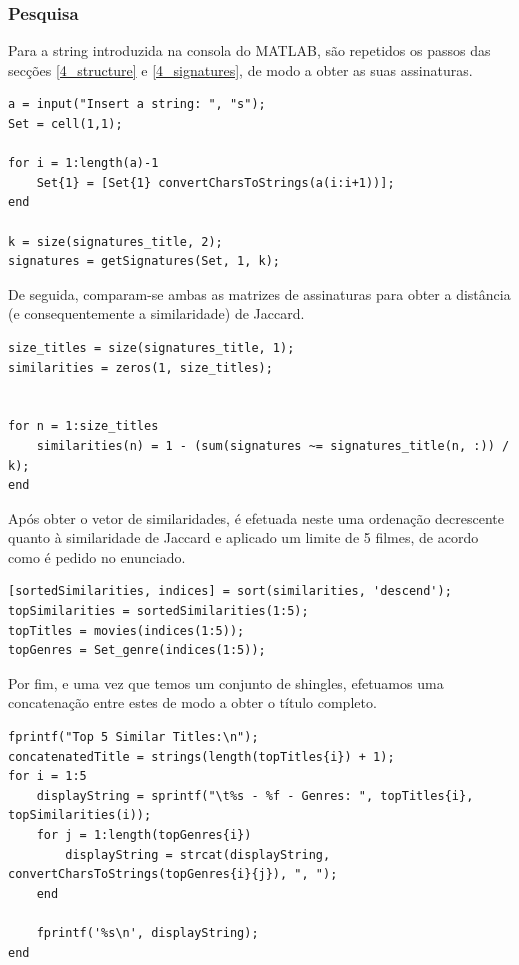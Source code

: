 \documentclass[portuguese, 11pt, a4paper,titlepage, oneside]{article}
\begin{document}
\subsubsection{Pesquisa}
Para a string introduzida na consola do MATLAB, são repetidos os passos das secções \ref{4_structure} e \ref{4_signatures}, de modo a obter as suas assinaturas.

\begin{lstlisting}[style=Matlab-editor]
a = input("Insert a string: ", "s");
Set = cell(1,1);

for i = 1:length(a)-1
    Set{1} = [Set{1} convertCharsToStrings(a(i:i+1))];
end

k = size(signatures_title, 2);
signatures = getSignatures(Set, 1, k);
\end{lstlisting}

De seguida, comparam-se ambas as matrizes de assinaturas para obter a distância (e consequentemente a similaridade) de Jaccard.

\begin{lstlisting}[style=Matlab-editor]
size_titles = size(signatures_title, 1);
similarities = zeros(1, size_titles);


for n = 1:size_titles
    similarities(n) = 1 - (sum(signatures ~= signatures_title(n, :)) / k);
end
\end{lstlisting}

Após obter o vetor de similaridades, é efetuada neste uma ordenação decrescente quanto à similaridade de Jaccard e aplicado um limite de 5 filmes, de acordo como é pedido no enunciado.
\begin{lstlisting}[style=Matlab-editor]
[sortedSimilarities, indices] = sort(similarities, 'descend');
topSimilarities = sortedSimilarities(1:5);
topTitles = movies(indices(1:5));
topGenres = Set_genre(indices(1:5));
\end{lstlisting}

Por fim, e uma vez que temos um conjunto de shingles, efetuamos uma concatenação entre estes de modo a obter o título completo.

\begin{lstlisting}[style=Matlab-editor]
fprintf("Top 5 Similar Titles:\n");
concatenatedTitle = strings(length(topTitles{i}) + 1);
for i = 1:5
    displayString = sprintf("\t%s - %f - Genres: ", topTitles{i}, topSimilarities(i));
    for j = 1:length(topGenres{i})
        displayString = strcat(displayString, convertCharsToStrings(topGenres{i}{j}), ", ");
    end

    fprintf('%s\n', displayString);
end
\end{lstlisting}
\end{document}
